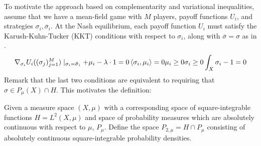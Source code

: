 To motivate the approach based on complementarity and variational inequalities, assume that we have a mean-field game with $M$ players, payoff functions $U_i$, and strategies $\sigma_i, \overbar{\sigma}_i$. At the Nash equilibrium, each payoff function $U_i$ must satisfy the Karush-Kuhn-Tucker (KKT) conditions with respect to $\sigma_i$, along with $\overbar{\sigma}=\sigma$ as in .
\begin{align}
  \nabla_{\sigma_i}U_i((\sigma_j)_{j=1}^M) \mid_{\sigma_i = \overbar{\sigma}_i}  + \mu_i - \lambda \cdot 1 = 0
  \ip{\sigma_i}{\mu_i} = 0
  \mu_i \geq 0
  \sigma_i \geq 0
  \int_X \sigma_i - 1 = 0
\end{align}
Remark that the last two conditions are equivalent to requiring that $\sigma \in P_{\mu}(X) \cap H$. This motivates the definition:
\begin{definition}
  Given a measure space $(X,\mu)$ with a corresponding space of square-integrable functions $H=L^2(X,\mu)$ and space of probability measures which are absolutely continuous with respect to $\mu$, $P_{\mu}$. Define the space $P_{2,\mu}=H \cap P_{\mu}$ consisting of absolutely continuous square-integrable probability densities.
\end{definition}

